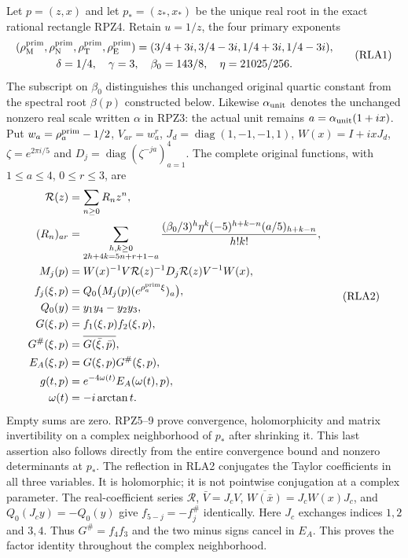 Let $p=(z,x)$ and let $p_*=(z_*,x_*)$ be the unique real root in the
exact rational rectangle RPZ4.  Retain $u=1/z$, the four primary
exponents
\[
 \begin{gathered} (\rho_{\mathrm M}^{\rm prim},\rho_{\mathrm N}^{\rm prim},
 \rho_{\mathrm T}^{\rm prim},\rho_{\mathrm E}^{\rm prim})
 =(3/4+3i,3/4-3i,1/4+3i,1/4-3i),\\
 \delta=1/4,\quad\gamma=3,\quad\beta_0=143/8,\quad\eta=21025/256.
 \end{gathered}\tag{RLA1}
\]
The subscript on $\beta_0$ distinguishes this unchanged original
quartic constant from the spectral root $\beta(p)$ constructed below.
Likewise $\alpha_{\rm unit}$ denotes the unchanged nonzero real
scale written $\alpha$ in RPZ3: the actual unit remains
$a=\alpha_{\rm unit}(1+ix)$.
Put $w_a=\rho_a^{\rm prim}-1/2$, $V_{ar}=w_a^r$,
$J_d=\operatorname{diag}(1,-1,-1,1)$, $W(x)=I+ixJ_d$,
$\zeta=e^{2\pi i/5}$ and $D_j=\operatorname{diag}(\zeta^{-ja})_{a=1}^4$.
The complete original functions, with $1\le a\le4$, $0\le r\le3$, are
\[
\begin{aligned}
 \mathcal R(z)&=\sum_{n\ge0}R_nz^n,\\
 (R_n)_{ar}&=\sum_{\substack{h,k\ge0\\2h+4k=5n+r+1-a}}
 \frac{(\beta_0/3)^h\eta^k(-5)^{h+k-n}(a/5)_{h+k-n}}{h!k!},\\
 M_j(p)&=W(x)^{-1}V\mathcal R(z)^{-1}D_j\mathcal R(z)V^{-1}W(x),\\
 f_j(\xi,p)&=Q_0\bigl(M_j(p)(e^{\rho_a^{\rm prim}\xi})_a\bigr),\\
 Q_0(y)&=y_1y_4-y_2y_3,\\
 G(\xi,p)&=f_1(\xi,p)f_2(\xi,p),\\
 G^\#(\xi,p)&=\overline{G(\bar\xi,\bar p)},\\
 E_A(\xi,p)&=G(\xi,p)G^\#(\xi,p),\\
 g(t,p)&=e^{-4\omega(t)}E_A(\omega(t),p),\\
 \omega(t)&=-i\arctan t.
\end{aligned}\tag{RLA2}
\]
Empty sums are zero.  RPZ5--9 prove convergence, holomorphicity and
matrix invertibility on a complex neighborhood of $p_*$ after shrinking
it.  This last assertion also follows directly from the entire
convergence bound and nonzero determinants at $p_*$.
The reflection in RLA2 conjugates the Taylor coefficients in all three
variables.  It is holomorphic; it is not pointwise conjugation at a
complex parameter.  The real-coefficient series $\mathcal R$,
$\bar V=J_cV$, $\overline{W(\bar x)}=J_cW(x)J_c$, and
$Q_0(J_cy)=-Q_0(y)$ give $f_{5-j}=-f_j^\#$ identically.
Here $J_c$ exchanges indices $1,2$ and $3,4$.
Thus $G^\#=f_4f_3$ and the two minus signs cancel in $E_A$.
This proves the factor identity throughout the complex neighborhood.

